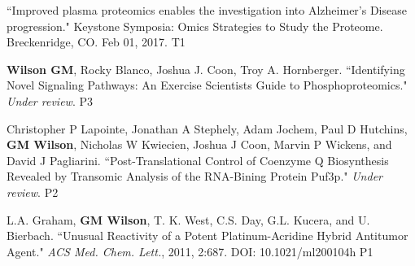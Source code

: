 

\begin{cvpubs}

  \cvpub
    {``Improved plasma proteomics enables the investigation into Alzheimer's Disease progression." Keystone Symposia: Omics Strategies to Study the Proteome. Breckenridge, CO. Feb 01, 2017.} %
    {T1} %

\end{cvpubs}


\begin{cvpubs}

  \cvpub
    {\textbf{Wilson GM}, Rocky Blanco, Joshua J. Coon, Troy A. Hornberger. ``Identifying Novel Signaling Pathways: An Exercise Scientists Guide to Phosphoproteomics." \textit{Under review}.} %
    {P3} %

  \cvpub
    {Christopher P Lapointe, Jonathan A Stephely, Adam Jochem, Paul D Hutchins, \textbf{GM Wilson}, Nicholas W Kwiecien, Joshua J Coon, Marvin P Wickens, and David J Pagliarini. ``Post-Translational Control of Coenzyme Q Biosynthesis Revealed by Transomic Analysis of the RNA-Bining Protein Puf3p." \textit{Under review}.} %
    {P2} %

  \cvpub
    {L.A. Graham, \textbf{GM Wilson}, T. K. West, C.S. Day, G.L. Kucera, and U. Bierbach. ``Unusual Reactivity of a Potent Platinum-Acridine Hybrid Antitumor Agent." \textit{ACS Med. Chem. Lett.}, 2011, 2:687. DOI: 10.1021/ml200104h} %
    {P1} %
    

\end{cvpubs}

